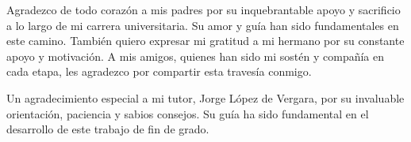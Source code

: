Agradezco de todo corazón a mis padres por su inquebrantable apoyo y sacrificio a lo largo de mi carrera universitaria. Su amor y guía han sido fundamentales en este camino. También quiero expresar mi gratitud a mi hermano por su constante apoyo y motivación. A mis amigos, quienes han sido mi sostén y compañía en cada etapa, les agradezco por compartir esta travesía conmigo.

Un agradecimiento especial a mi tutor, Jorge López de Vergara, por su invaluable orientación, paciencia y sabios consejos. Su guía ha sido fundamental en el desarrollo de este trabajo de fin de grado.
